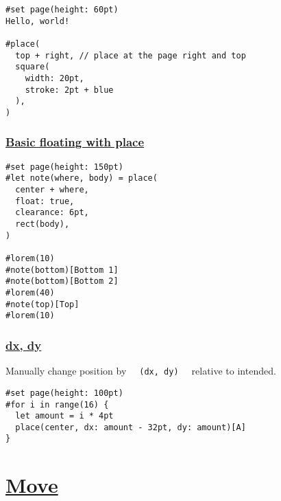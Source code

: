 \begin{verbatim}
#set page(height: 60pt)
Hello, world!

#place(
  top + right, // place at the page right and top
  square(
    width: 20pt,
    stroke: 2pt + blue
  ),
)
\end{verbatim}

\pandocbounded{}

\subsubsection{\texorpdfstring{\hyperref[basic-floating-with-place]{Basic
floating with
place}}{Basic floating with place}}\label{basic-floating-with-place}

\begin{verbatim}
#set page(height: 150pt)
#let note(where, body) = place(
  center + where,
  float: true,
  clearance: 6pt,
  rect(body),
)

#lorem(10)
#note(bottom)[Bottom 1]
#note(bottom)[Bottom 2]
#lorem(40)
#note(top)[Top]
#lorem(10)
\end{verbatim}

\pandocbounded{}

\pandocbounded{}

\subsubsection{\texorpdfstring{\hyperref[dx-dy]{dx,
dy}}{dx, dy}}\label{dx-dy}

Manually change position by
\texttt{\ }{\texttt{\ (dx,\ dy)\ }}\texttt{\ } relative to intended.

\begin{verbatim}
#set page(height: 100pt)
#for i in range(16) {
  let amount = i * 4pt
  place(center, dx: amount - 32pt, dy: amount)[A]
}
\end{verbatim}

\pandocbounded{}

\section{\texorpdfstring{\hyperref[move]{Move}}{Move}}\label{move}

